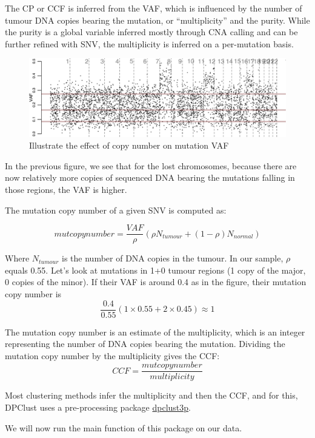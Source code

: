 \documentclass[]{article}
\begin{document}
The CP or CCF is inferred from the VAF, which is influenced by the
number of tumour DNA copies bearing the mutation, or ``multiplicity''
and the purity. While the purity is a global variable inferred mostly
through CNA calling and can be further refined with SNV, the
multiplicity is inferred on a per-mutation basis.

\begin{figure}

{\centering \includegraphics{src_guide_files/figure-latex/fig6-1} 

}

\caption{\label{fig6} Illustrate the effect of copy number on mutation VAF}\label{fig:fig6}
\end{figure}

In the previous figure, we see that for the lost chromosomes, because
there are now relatively more copies of sequenced DNA bearing the
mutations falling in those regions, the VAF is higher.

The mutation copy number of a given SNV is computed as:

\[ mutcopynumber=\frac{VAF}{\rho}(\rho N_{tumour} + (1-\rho) N_{normal})\]

Where \(N_{tumour}\) is the number of DNA copies in the tumour. In our
sample, \(\rho\) equals 0.55. Let's look at mutations in 1+0 tumour
regions (1 copy of the major, 0 copies of the minor). If their VAF is
around 0.4 as in the figure, their mutation copy number is
\[\frac{0.4}{0.55}(1 \times 0.55+2 \times 0.45) \approx 1\]

The mutation copy number is an estimate of the multiplicity, which is an
integer representing the number of DNA copies bearing the mutation.
Dividing the mutation copy number by the multiplicity gives the CCF:
\[CCF=\frac{mutcopynumber}{multiplicity}\]

Most clustering methods infer the multiplicity and then the CCF, and for
this, DPClust uses a pre-processing package
\href{https://github.com/Wedge-Oxford/dpclust_smchet_docker/blob/master/dpclust3p_v1.0.6.tar.gz}{dpclust3p}.

We will now run the main function of this package on our data.
\end{document}

